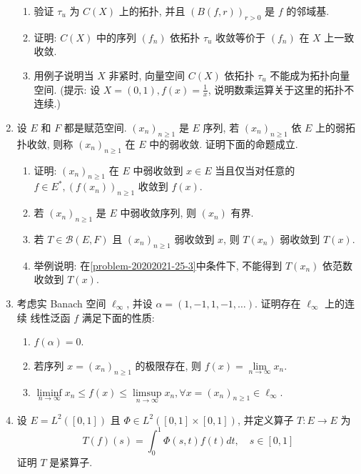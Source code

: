 \begin{enumerate}
            \begin{enumerate}
                \item 验证 $\tau_{u}$ 为 $C(X)$ 上的拓扑, 并且 $(B(f, r))_{r>0}$ 是 $f$ 的邻域基.
                \item 证明: $C(X)$ 中的序列 $\left(f_{n}\right)$ 依拓扑 $\tau_{u}$ 收敛等价于 $\left(f_{n}\right)$ 在 $X$ 上一致收敛.
                \item 用例子说明当 $X$ 非紧时, 向量空间 $C(X)$ 依拓扑 $\tau_{u}$ 不能成为拓扑向量空间. (提示: 设 $X=(0,1), f(x)=\frac{1}{x}$, 说明数乘运算关于这里的拓扑不连续.)
            \end{enumerate}
        \item 设 $E$ 和 $F$ 都是赋范空间. $\left(x_{n}\right)_{n \geq 1}$ 是 $E$ 序列, 若 $\left(x_{n}\right)_{n \geq 1}$ 依 $E$ 上的弱拓扑收敛, 则称 $\left(x_{n}\right)_{n \geq 1}$ 在 $E$ 中的弱收敛. 证明下面的命题成立.
            \begin{enumerate}
                \item 证明: $\left(x_{n}\right)_{n \geq 1}$ 在 $E$ 中弱收敛到 $x \in E$ 当且仅当对任意的 $f \in E^{*},\left(f\left(x_{n}\right)\right)_{n \geq 1}$ 收敛到 $f(x)$.
                \item 若 $\left(x_{n}\right)_{n \geq 1}$ 是 $E$ 中弱收敛序列, 则 $\left(x_{n}\right)$ 有界.
                \item\label{problem-20202021-25-3} 若 $T \in \mathcal{B}(E, F)$ 且 $\left(x_{n}\right)_{n \geq 1}$ 弱收敛到 $x$, 则 $T\left(x_{n}\right)$ 弱收敛到 $T(x)$.
                \item 举例说明: 在\ref{problem-20202021-25-3}中条件下, 不能得到 $T\left(x_{n}\right)$ 依范数收敛到 $T(x)$.
            \end{enumerate}
        \item 考虑实 Banach 空间 $\ell_{\infty}$, 并设 $\alpha=(1,-1,1,-1, \ldots)$. 证明存在 $\ell_{\infty}$ 上的连续 线性泛函 $f$ 满足下面的性质:
            \begin{enumerate}
                \item $f(\alpha)=0$.
                \item 若序列 $x=\left(x_{n}\right)_{n \geq 1}$ 的极限存在, 则 $f(x)=\lim \limits_{n \rightarrow \infty} x_{n}$.
                \item $\liminf \limits_{n \rightarrow \infty} x_{n} \leq f(x) \leq \limsup \limits_{n \rightarrow \infty} x_{n}, \forall x=\left(x_{n}\right)_{n \geq 1} \in \ell_{\infty}$.
            \end{enumerate}
        \item 设 $E=L^{2}([0,1])$ 且 $\Phi \in L^{2}([0,1] \times[0,1])$, 并定义算子 $T: E \rightarrow E$ 为
        \[
        T(f)(s)=\int_{0}^{1} \Phi(s, t) f(t) d t, \quad s \in[0,1]
        \]
        证明 $T$ 是紧算子.
    \end{enumerate}



